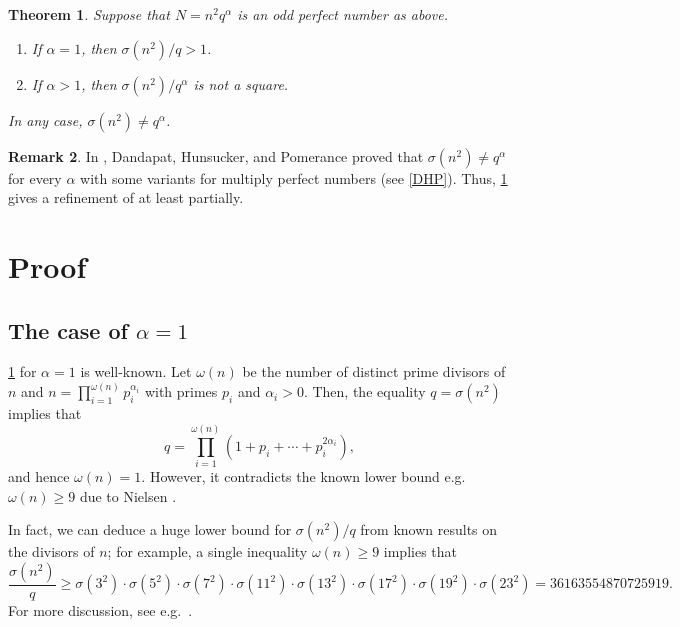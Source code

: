 \documentclass[11pt]{amsart}
\theoremstyle{plain}
\newtheorem{theorem}{Theorem}[section]
\theoremstyle{definition}
\newtheorem{remark}[theorem]{Remark}
\begin{document}
\begin{theorem} \label{2-perfect}
Suppose that $N = n^{2}q^{\alpha}$ is an odd perfect number as above.
\begin{enumerate}
\item
If $\alpha = 1$, then $\sigma(n^{2})/q > 1$.  

\item
If $\alpha > 1$, then $\sigma(n^{2})/q^{\alpha} $ is not a square.
\end{enumerate}
In any case, $\sigma(n^{2}) \neq q^{\alpha}$.
\end{theorem}




\begin{remark} \label{DHP1}
In \cite[Theorem 1]{Dandapat-Hunsucker-Pomerance},
Dandapat, Hunsucker, and Pomerance proved that
$\sigma(n^{2}) \neq q^{\alpha}$ for every $\alpha$
with some variants for multiply perfect numbers (see \cref{DHP}).
Thus, \cref{2-perfect} gives a refinement of \cite{Dandapat-Hunsucker-Pomerance}
at least partially.
\end{remark}



\section{Proof}

\subsection{The case of $\alpha = 1$}

\cref{2-perfect} for $\alpha = 1$ is well-known.
Let $\omega(n)$ be the number of distinct prime divisors of $n$
and $n = \prod_{i = 1}^{\omega(n)} p_{i}^{\alpha_{i}}$ with primes $p_{i}$ and $\alpha_{i} > 0$.
Then, the equality $q = \sigma(n^{2})$ implies that
\[
	q = \prod_{i = 1}^{\omega(n)} (1+p_{i}+\cdots+p_{i}^{2\alpha_{i}}),
\]
and hence $\omega(n) = 1$.
However, it contradicts the known lower bound e.g.\ $\omega(n) \geq 9$ due to Nielsen \cite[Theorem 3.8]{Nielsen}.

In fact,
we can deduce a huge lower bound for $\sigma(n^{2})/q$
from known results on the divisors of $n$;
for example, a single inequality $\omega(n) \geq 9$ implies that
\[
	\frac{\sigma(n^{2})}{q}
	\geq \sigma(3^{2}) \cdot \sigma(5^{2}) \cdot \sigma(7^{2}) \cdot \sigma(11^{2})
		\cdot \sigma(13^{2}) \cdot \sigma(17^{2}) \cdot \sigma(19^{2}) \cdot \sigma(23^{2})
	= 36163554870725919.
\]
For more discussion, see e.g.\ \cite{Nielsen}.
\end{document}
